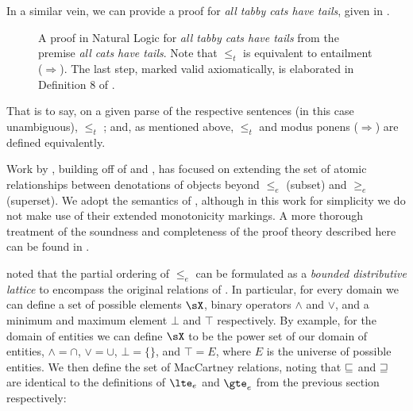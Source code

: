 In a similar vein, we can provide a proof for \textit{all tabby cats
  have tails}, given in .

\begin{figure*}
  \begin{prooftree}
  \end{prooftree}
\caption{\label{fig:catsproof}
  A proof in Natural Logic for \textit{all tabby cats have tails} from
    the premise \textit{all cats have tails}.
  Note that $\le_t$ is equivalent to entailment ($\Rightarrow$).
  The last step, marked valid axiomatically, is elaborated in
    Definition 8 of .
} 
\end{figure*}

That is to say, on a given parse of the respective sentences (in this
  case unambiguous),
   $\leq_t$ ;
  and, as mentioned above, $\leq_t$ and modus ponens ($\Rightarrow$)
  are defined equivalently.


Work by , building off of
   and
  ,
  has focused on extending the set of atomic relationships between
  denotations of objects beyond $\leq_e$ (subset) and $\geq_e$ (superset).
We adopt the semantics of , although in this
  work for simplicity we do not make use of their extended
  monotonicity markings.
A more thorough treatment of the soundness and completeness of the
  proof theory described here can be found in
  .

 noted that the partial ordering of
  $\leq_e$ can be formulated as a \textit{bounded distributive
  lattice} to encompass the original relations of
  .
In particular, for every domain we can define a set of possible 
  elements $\sX$, binary operators $\land$ and $\lor$,
  and a minimum and maximum element $\bot$ and $\top$ respectively.
By example, for the domain of entities we can define $\sX$ to be
  the power set of our domain of entities, $\land=\cap$,
  $\lor=\cup$, $\bot=\{\}$, and $\top=E$, where $E$ is the universe
  of possible entities.
We then define the set of MacCartney relations, noting that
  $\forward$ and $\reverse$ are identical to the definitions of
  $\lte_e$ and $\gte_e$ from the previous section respectively:

